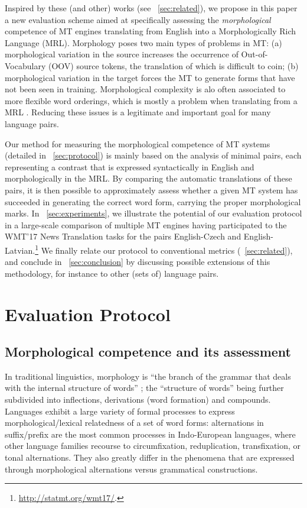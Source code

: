 \documentclass[11pt,letterpaper,final,nohyperref]{article}
\begin{document}
Inspired by these (and other) works (see \textsection{}~\ref{sec:related}), we propose in this paper a new evaluation scheme aimed at specifically assessing the \emph{morphological} competence of MT engines translating from English into a Morphologically Rich Language (MRL). Morphology poses two main types of problems in MT: (a) morphological variation in the source increases the occurrence of Out-of-Vocabulary (OOV) source tokens, the translation of which is difficult to coin; (b) morphological variation in the target forces the MT to generate forms that have not been seen in training. 
Morphological complexity is alo often associated to more flexible word orderings, which is mostly a problem when translating from a MRL \cite{bisazza16reorder}. Reducing these issues is a legitimate and important goal for many language pairs.

Our method for measuring the morphological competence of MT systems (detailed in \textsection~\ref{sec:protocol}) is mainly based on the analysis of minimal pairs, each representing a contrast that is expressed syntactically in English and morphologically in the MRL. By comparing the automatic translations of these pairs, it is then possible to approximately assess whether a given MT system has succeeded in generating the correct word form, carrying the proper morphological marks. In \textsection~\ref{sec:experiments}, we illustrate the potential of our evaluation protocol in a large-scale comparison of multiple MT engines having participated to the WMT'17 News Translation tasks for the pairs English-Czech and English-Latvian.\footnote{\url{http://statmt.org/wmt17/}.}
We finally relate our protocol to conventional metrics (\textsection{}~\ref{sec:related}), and conclude in \textsection{}~\ref{sec:conclusion} by discussing possible extensions of this methodology, for instance to other (sets of) language pairs.

\section{Evaluation Protocol \label{sec:protocol}}

\subsection{Morphological competence and its assessment }

In traditional linguistics, morphology is ``the branch of the grammar that deals with the internal structure of words'' \cite[p.~9]{Matthews74morphology}; the ``structure of words'' being further subdivided into inflections, derivations (word formation) and compounds. Languages exhibit a large variety of formal processes to express morphological/lexical relatedness of a set of word forms: alternations in suffix/prefix are the most common processes in Indo-European languages, where other language families recourse to circumfixation, reduplication, transfixation, or tonal alternations. They also greatly differ in the phenomena that are expressed through morphological alternations versus grammatical constructions. 
\end{document}
